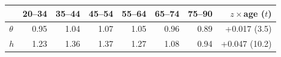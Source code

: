 \begin{tabular}{lrrrrrrr}
\toprule
 & 20--34 & 35--44 & 45--54 & 55--64 & 65--74 & 75--90 & $z\times$age ($t$) \\
\midrule
$\theta$ & 0.95 & 1.04 & 1.07 & 1.05 & 0.96 & 0.89 & +0.017 (3.5) \\
$h$ & 1.23 & 1.36 & 1.37 & 1.27 & 1.08 & 0.94 & +0.047 (10.2) \\
\bottomrule
\end{tabular}
